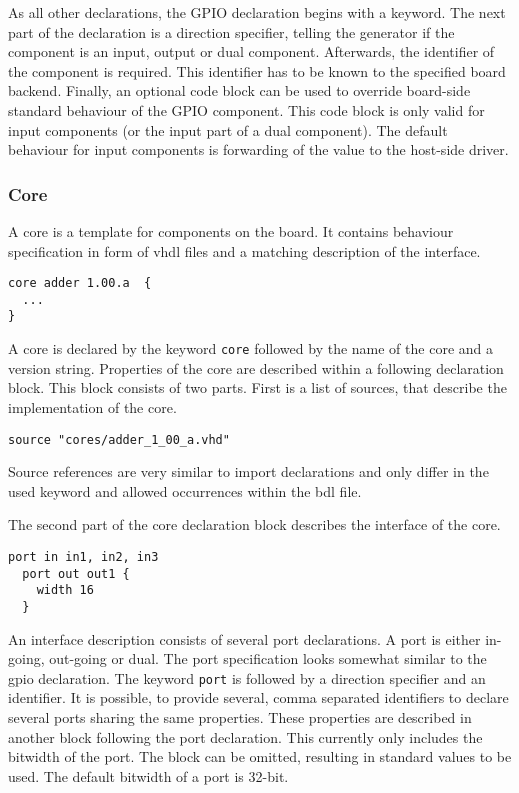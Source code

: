 \documentclass{report}
\begin{document}
As all other declarations, the GPIO declaration begins with a keyword. The next part of the declaration is a direction specifier, telling the generator if the component is an input, output or dual component.
Afterwards, the identifier of the component is required. This identifier has to be known to the specified board backend.
Finally, an optional code block can be used to override board-side standard behaviour of the GPIO component. This code block is only valid for input components (or the input part of a dual component). The default behaviour for input components is forwarding of the value to the host-side driver.

\subsubsection{Core}
A core is a template for components on the board. It contains behaviour specification in form of vhdl files and a matching description of the interface.

\begin{lstlisting}[language=bdl]
core adder 1.00.a  {
  ...
}
\end{lstlisting}

A core is declared by the keyword \texttt{core} followed by the name of the core and a version string. Properties of the core are described within a following declaration block. This block consists of two parts. First is a list of sources, that describe the implementation of the core.

\begin{lstlisting}[language=bdl]
  source "cores/adder_1_00_a.vhd"
\end{lstlisting}

Source references are very similar to import declarations and only differ in the used keyword and allowed occurrences within the bdl file.

The second part of the core declaration block describes the interface of the core.

\begin{lstlisting}[language=bdl]
  port in in1, in2, in3
  port out out1 {
    width 16
  }
\end{lstlisting}

An interface description consists of several port declarations. A port is either in-going, out-going or dual. The port specification looks somewhat similar to the gpio declaration. The keyword \texttt{port} is followed by a direction specifier and an identifier. It is possible, to provide several, comma separated identifiers to declare several ports sharing the same properties. These properties are described in another block following the port declaration. This currently only includes the bitwidth of the port. The block can be omitted, resulting in standard values to be used. The default bitwidth of a port is 32-bit.
\end{document}
